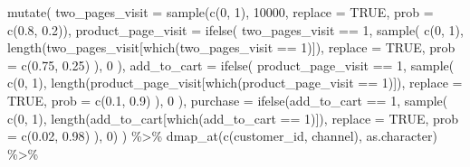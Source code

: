\documentclass[
]{book}
\newenvironment{Shaded}{\begin{snugshade}}{\end{snugshade}}
\newcommand{\AttributeTok}[1]{\textcolor[rgb]{0.77,0.63,0.00}{#1}}
\newcommand{\ConstantTok}[1]{\textcolor[rgb]{0.00,0.00,0.00}{#1}}
\newcommand{\DecValTok}[1]{\textcolor[rgb]{0.00,0.00,0.81}{#1}}
\newcommand{\FloatTok}[1]{\textcolor[rgb]{0.00,0.00,0.81}{#1}}
\newcommand{\FunctionTok}[1]{\textcolor[rgb]{0.00,0.00,0.00}{#1}}
\newcommand{\NormalTok}[1]{#1}
\newcommand{\SpecialCharTok}[1]{\textcolor[rgb]{0.00,0.00,0.00}{#1}}
\newcommand{\StringTok}[1]{\textcolor[rgb]{0.31,0.60,0.02}{#1}}
\begin{document}
\begin{Shaded}
\begin{Highlighting}[]
  \FunctionTok{mutate}\NormalTok{(}
    \AttributeTok{two\_pages\_visit =} \FunctionTok{sample}\NormalTok{(}\FunctionTok{c}\NormalTok{(}\DecValTok{0}\NormalTok{, }\DecValTok{1}\NormalTok{), }\DecValTok{10000}\NormalTok{, }\AttributeTok{replace =} \ConstantTok{TRUE}\NormalTok{, }\AttributeTok{prob =} \FunctionTok{c}\NormalTok{(}\FloatTok{0.8}\NormalTok{, }\FloatTok{0.2}\NormalTok{)),}
    \AttributeTok{product\_page\_visit =} \FunctionTok{ifelse}\NormalTok{(}
\NormalTok{      two\_pages\_visit }\SpecialCharTok{==} \DecValTok{1}\NormalTok{,}
      \FunctionTok{sample}\NormalTok{(}
        \FunctionTok{c}\NormalTok{(}\DecValTok{0}\NormalTok{, }\DecValTok{1}\NormalTok{),}
        \FunctionTok{length}\NormalTok{(two\_pages\_visit[}\FunctionTok{which}\NormalTok{(two\_pages\_visit }\SpecialCharTok{==} \DecValTok{1}\NormalTok{)]),}
        \AttributeTok{replace =} \ConstantTok{TRUE}\NormalTok{,}
        \AttributeTok{prob =} \FunctionTok{c}\NormalTok{(}\FloatTok{0.75}\NormalTok{, }\FloatTok{0.25}\NormalTok{)}
\NormalTok{      ),}
      \DecValTok{0}
\NormalTok{    ),}
    \AttributeTok{add\_to\_cart =} \FunctionTok{ifelse}\NormalTok{(}
\NormalTok{      product\_page\_visit }\SpecialCharTok{==} \DecValTok{1}\NormalTok{,}
      \FunctionTok{sample}\NormalTok{(}
        \FunctionTok{c}\NormalTok{(}\DecValTok{0}\NormalTok{, }\DecValTok{1}\NormalTok{),}
        \FunctionTok{length}\NormalTok{(product\_page\_visit[}\FunctionTok{which}\NormalTok{(product\_page\_visit }\SpecialCharTok{==} \DecValTok{1}\NormalTok{)]),}
        \AttributeTok{replace =} \ConstantTok{TRUE}\NormalTok{,}
        \AttributeTok{prob =} \FunctionTok{c}\NormalTok{(}\FloatTok{0.1}\NormalTok{, }\FloatTok{0.9}\NormalTok{)}
\NormalTok{      ),}
      \DecValTok{0}
\NormalTok{    ),}
    \AttributeTok{purchase =} \FunctionTok{ifelse}\NormalTok{(add\_to\_cart }\SpecialCharTok{==} \DecValTok{1}\NormalTok{,}
                      \FunctionTok{sample}\NormalTok{(}
                        \FunctionTok{c}\NormalTok{(}\DecValTok{0}\NormalTok{, }\DecValTok{1}\NormalTok{),}
                        \FunctionTok{length}\NormalTok{(add\_to\_cart[}\FunctionTok{which}\NormalTok{(add\_to\_cart }\SpecialCharTok{==} \DecValTok{1}\NormalTok{)]),}
                        \AttributeTok{replace =} \ConstantTok{TRUE}\NormalTok{,}
                        \AttributeTok{prob =} \FunctionTok{c}\NormalTok{(}\FloatTok{0.02}\NormalTok{, }\FloatTok{0.98}\NormalTok{)}
\NormalTok{                      ),}
                      \DecValTok{0}\NormalTok{)}
\NormalTok{  ) }\SpecialCharTok{\%\textgreater{}\%}
  \FunctionTok{dmap\_at}\NormalTok{(}\FunctionTok{c}\NormalTok{(}\StringTok{\textquotesingle{}customer\_id\textquotesingle{}}\NormalTok{, }\StringTok{\textquotesingle{}channel\textquotesingle{}}\NormalTok{), as.character) }\SpecialCharTok{\%\textgreater{}\%}

\end{Highlighting}
\end{Shaded}
\end{document}
